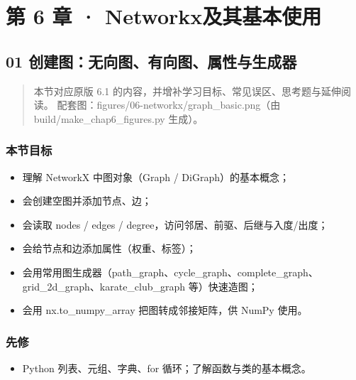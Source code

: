 \chapter{第 6 章 ·
Networkx及其基本使用}\label{ux7b2c-6-ux7ae0-networkxux53caux5176ux57faux672cux4f7fux7528}

\section{01
创建图：无向图、有向图、属性与生成器}\label{ux521bux5efaux56feux65e0ux5411ux56feux6709ux5411ux56feux5c5eux6027ux4e0eux751fux6210ux5668}

\begin{quote}
本节对应原版 6.1 的内容，并增补学习目标、常见误区、思考题与延伸阅读。
配套图：figures/06-networkx/graph\_basic.png（由
build/make\_chap6\_figures.py 生成）。
\end{quote}

\subsection{本节目标}\label{ux672cux8282ux76eeux6807-23}

\begin{itemize}
\tightlist
\item
  理解 NetworkX 中图对象（Graph / DiGraph）的基本概念；
\item
  会创建空图并添加节点、边；
\item
  会读取 nodes / edges / degree，访问邻居、前驱、后继与入度/出度；
\item
  会给节点和边添加属性（权重、标签）；
\item
  会用常用图生成器（path\_graph、cycle\_graph、complete\_graph、grid\_2d\_graph、karate\_club\_graph
  等）快速造图；
\item
  会用 nx.to\_numpy\_array 把图转成邻接矩阵，供 NumPy 使用。
\end{itemize}

\subsection{先修}\label{ux5148ux4fee-16}

\begin{itemize}
\tightlist
\item
  Python 列表、元组、字典、for 循环；了解函数与类的基本概念。
\end{itemize}


